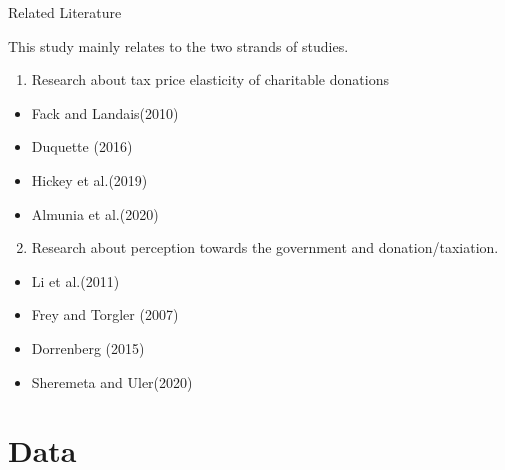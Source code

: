 \documentclass[
  ignorenonframetext,
]{beamer}
\providecommand{\tightlist}{%
  \setlength{\itemsep}{0pt}\setlength{\parskip}{0pt}}
\begin{document}
\begin{frame}{Related Literature}
\protect\hypertarget{related-literature}{}

This study mainly relates to the two strands of studies.

\begin{enumerate}
\tightlist
\item
  Research about tax price elasticity of charitable donations
\end{enumerate}

\begin{itemize}
\tightlist
\item
  Fack and Landais(2010)
\item
  Duquette (2016)
\item
  Hickey et al.(2019)
\item
  Almunia et al.(2020)
\end{itemize}

\begin{enumerate}
\setcounter{enumi}{1}
\tightlist
\item
  Research about perception towards the government and
  donation/taxiation.
\end{enumerate}

\begin{itemize}
\tightlist
\item
  Li et al.(2011)
\item
  Frey and Torgler (2007)
\item
  Dorrenberg (2015)
\item
  Sheremeta and Uler(2020)
\end{itemize}

\end{frame}

\hypertarget{data}{%
\section{Data}\label{data}}
\end{document}
